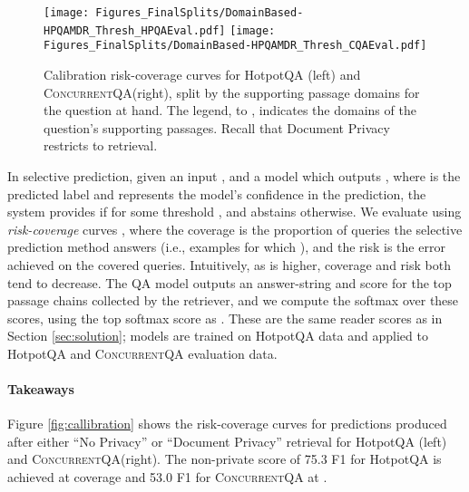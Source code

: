 \documentclass{article}
\renewcommand\cite{\citep}	\newcommand\shortcite{\citeyearpar}\newcommand\newcite{\citet}
\newcommand{\datasetname}{\textsc{ConcurrentQA}\xspace}
\begin{document}
\begin{figure}
    \centering
    \texttt{[image: Figures\_FinalSplits/DomainBased-HPQAMDR\_Thresh\_HPQAEval.pdf]}
    \texttt{[image: Figures\_FinalSplits/DomainBased-HPQAMDR\_Thresh\_CQAEval.pdf]}
    \caption[width=0.9\linewidth]{Calibration risk-coverage curves for HotpotQA (left) and \datasetname (right), split by the supporting passage domains for the question at hand. The legend,  to , indicates the domains of the question's supporting passages. Recall that Document Privacy restricts  to  retrieval.} 
    \label{fig:callibration_by_domain}
\end{figure}


In selective prediction, given an input , and a model which outputs , where  is the predicted label and  represents the model's confidence in the prediction, the system provides  if  for some threshold , and abstains otherwise. 
We evaluate using \textit{risk-coverage} curves \cite{elyaniv2010selectivepred}, where the coverage is the proportion of queries the selective prediction method answers (i.e., examples for which ), and the risk is the error achieved on the covered queries. Intuitively, as  is higher, coverage and risk both tend to decrease. The QA model outputs an answer-string and score for the top  passage chains collected by the retriever, and we compute the softmax over these scores, using the top softmax score as  \cite{hendrycks2017maxprob}.
These are the same reader scores as in Section \ref{sec:solution}; models are trained on HotpotQA data and applied to HotpotQA and \datasetname evaluation data.


\paragraph{Takeaways} 
Figure \ref{fig:callibration} shows the risk-coverage curves for predictions produced after either ``No Privacy'' or ``Document Privacy'' retrieval for HotpotQA (left) and \datasetname (right). The non-private score of 75.3 F1 for HotpotQA is achieved at  coverage and 53.0 F1 for \datasetname at . 
\end{document}
